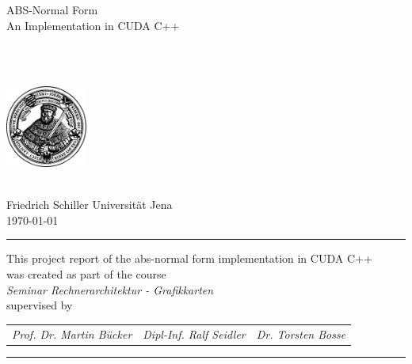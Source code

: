 \huge
ABS-Normal Form \\ An Implementation in CUDA C++ \\

\vspace{1cm}

\normalsize
\authorName \\
\email \\


\begin{center}
	\includegraphics[width=0.2\textwidth]{img/hanfried.png}
\end{center}
\hfill \\
Friedrich Schiller Universität Jena \\
\vspace{0.5cm}
\monthyeardate\today
\vspace{0.5cm}
\hrule
\vspace{0.5cm}
This project report of the abs-normal form implementation in CUDA C++ \\ was created as part of the course\\[0.1cm]
\emph{Seminar Rechnerarchitektur - Grafikkarten}\\[0.1cm]
supervised by\\[0.1cm]

\begin{tabular}{r c l}
	\emph{Prof. Dr. Martin Bücker} & \emph{Dipl-Inf. Ralf Seidler} & \emph{Dr. Torsten Bosse}
\end{tabular}
\hfill

\vfill
\hrule
\vspace{0.5cm}
\begin{abstract}
	\itshape
	
\end{abstract}
\newpage